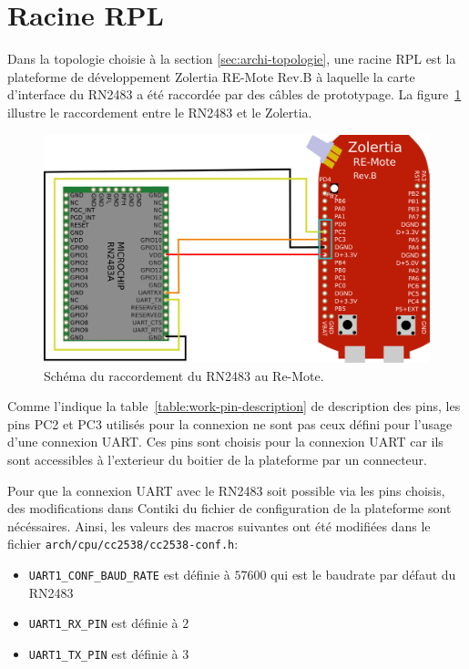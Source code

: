 \section{Racine RPL}\label{sec:work-rpl-root}
\renewcommand{\rightmark}{Racine RPL}

    Dans la topologie choisie à la section \ref{sec:archi-topologie}, une racine RPL est la plateforme de développement Zolertia RE-Mote Rev.B à laquelle la carte d'interface du RN2483 a été raccordée par des câbles de prototypage. La figure~\ref{fig:work-montage} illustre le raccordement entre le RN2483 et le Zolertia.
    
    \begin{figure}[H]
        \centering
        \includegraphics[scale=0.35]{res/pictures/montage.png}
        \caption{Schéma du raccordement du RN2483 au Re-Mote.}
        \label{fig:work-montage}
    \end{figure}

    Comme l'indique la table~\ref{table:work-pin-description} de description des pins, les pins PC2 et PC3 utilisés pour la connexion ne sont pas ceux défini pour l'usage d'une connexion UART. Ces pins sont choisis pour la connexion UART car ils sont accessibles à l'exterieur du boitier de la plateforme par un connecteur.
    
    Pour que la connexion UART avec le RN2483 soit possible via les pins choisis, des modifications 
    dans Contiki du fichier de configuration de la plateforme sont nécéssaires.
    Ainsi, les valeurs des macros suivantes ont été modifiées dans le fichier \texttt{arch/cpu/cc2538/cc2538-conf.h}:
    \begin{itemize}
        \item \texttt{UART1\_CONF\_BAUD\_RATE} est définie à $57600$ qui est le baudrate par défaut du RN2483
        \item \texttt{UART1\_RX\_PIN} est définie à $2$
        \item \texttt{UART1\_TX\_PIN} est définie à $3$
    \end{itemize}

